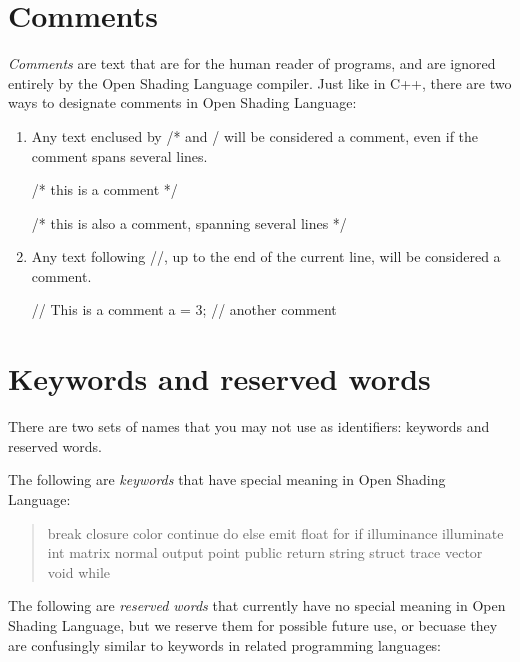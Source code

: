 \documentclass[11pt,letterpaper]{book}
\def\langname{Open Shading Language\xspace}
\begin{document}
\section{Comments}
\label{sec:comments}

\emph{Comments} are text that are for the human reader of programs, and
are ignored entirely by the \langname compiler.  Just like in C++, there
are two ways to designate comments in \langname:

\begin{enumerate}
\item Any text enclused by {\cf /*} and {\cf */} will be considered
a comment, even if the comment spans several lines.

\begin{code}
    /* this is a comment */

    /* this is also
       a comment, spanning
       several lines */
\end{code}

\item Any text following {\cf //}, up to the end of the current line,
will be considered a comment.

\begin{code}
    // This is a comment
    a = 3;   // another comment
\end{code}
\end{enumerate}


\section{Keywords and reserved words}
\label{sec:lexical:keyreserved}

There are two sets of names that you may not use as identifiers:
keywords and reserved words.

The following are \emph{keywords} that have special meaning in
\langname: 

\begin{quote} {\cf

break closure color continue do else emit float for if illuminance
illuminate int matrix normal output point public return string struct
trace vector void while

}
\end{quote}

The following are \emph{reserved words} that currently have no special
meaning in \langname, but we reserve them for possible future use, or
becuase they are confusingly similar to keywords in related programming
languages: 
\end{document}
